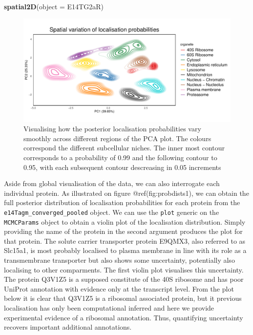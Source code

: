 \documentclass[
]{article}
\newenvironment{Shaded}{\begin{snugshade}}{\end{snugshade}}
\newcommand{\DataTypeTok}[1]{\textcolor[rgb]{0.13,0.29,0.53}{#1}}
\newcommand{\KeywordTok}[1]{\textcolor[rgb]{0.13,0.29,0.53}{\textbf{#1}}}
\newcommand{\NormalTok}[1]{#1}
\begin{document}
\begin{Shaded}
\begin{Highlighting}[]
\KeywordTok{spatial2D}\NormalTok{(}\DataTypeTok{object =}\NormalTok{ E14TG2aR)}
\end{Highlighting}
\end{Shaded}

\begin{figure}
\includegraphics[width=0.7\linewidth]{F1000TAGMworkflow_rev1_files/figure-latex/spatialplot-1} \caption{Visualising how the posterior localisation  probabilities vary smoothly across different regions of the PCA plot. The colours correspond the different subcellular niches. The inner most contour corresponds to a probability of 0.99 and the following contour to 0.95, with each subsequent contour descreasing in 0.05 increments}\label{fig:spatialplot}
\end{figure}

Aside from global visualisation of the data, we can also interrogate
each individual protein. As illustrated on figure @ref(fig:probdists1),
we can obtain the full posterior distribution of localisation
probabilities for each protein from the
\texttt{e14Tagm\_converged\_pooled} object. We can use the \texttt{plot}
generic on the \texttt{MCMCParams} object to obtain a violin plot of the
localisation distribution. Simply providing the name of the protein in
the second argument produces the plot for that protein. The solute
carrier transporter protein E9QMX3, also referred to as Slc15a1, is most
probably localised to plasma membrane in line with its role as a
transmembrane transporter but also shows some uncertainty, potentially
also localising to other comparments. The first violin plot visualises
this uncertainty. The protein Q3V1Z5 is a supposed constitute of the 40S
ribosome and has poor UniProt annotation with evidence only at the
transcript level. From the plot below it is clear that Q3V1Z5 is a
ribosomal associated protein, but it previous localisation has only been
computational inferred and here we provide experimental evidence of a
ribosomal annotation. Thus, quantifying uncertainty recovers important
additional annotations.
\end{document}
